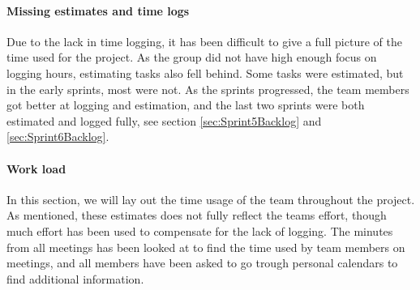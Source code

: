\documentclass[11pt,a4paper,titlepage,oneside]{report}
\begin{document}
\paragraph{Missing estimates and time logs}
Due to the lack in time logging, it has been difficult to give a full picture of the time used for the project. As the group did not have high enough focus on logging hours, estimating tasks also fell behind. Some tasks were estimated, but in the early sprints, most were not. As the sprints progressed, the team members got better at logging and estimation, and the last two sprints were both estimated and logged fully, see section \ref{sec:Sprint5Backlog} and \ref{sec:Sprint6Backlog}.

\paragraph{Work load}
In this section, we will lay out the time usage of the team throughout the project. As mentioned, these estimates does not fully reflect the teams effort, though much effort has been used to compensate for the lack of logging. The minutes from all meetings has been looked at to find the time used by team members on meetings, and all members have been asked to go trough personal calendars to find additional information.
\end{document}
